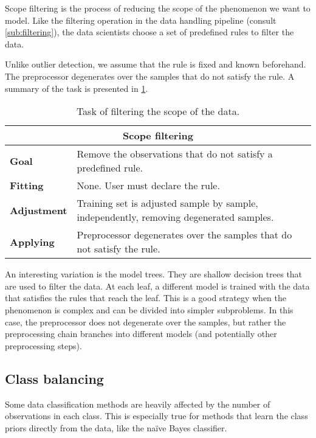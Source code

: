 Scope filtering is the process of reducing the scope of the phenomenon we want to model.
Like the filtering operation in the data handling pipeline (consult \cref{sub:filtering}),
the data scientists choose a set of predefined rules to filter the data.

Unlike outlier detection, we assume that the rule is fixed and known beforehand.  The
preprocessor degenerates over the samples that do not satisfy the rule.  A summary of the
task is presented in \cref{tab:scope-filtering}.

\begin{table}\caption{Task of filtering the scope of the data.}
  \centering
  \begin{tabular}{lp{6cm}}
    \toprule
    \multicolumn{2}{c}{\textbf{Scope filtering}} \\
    \midrule
    \textbf{Goal} &
      Remove the observations that do not satisfy a predefined rule. \\
    \textbf{Fitting} &
      None. User must declare the rule. \\
    \textbf{Adjustment} &
      Training set is adjusted sample by sample, independently, removing degenerated
      samples. \\
    \textbf{Applying} &
      Preprocessor degenerates over the samples that do not satisfy the rule. \\
    \bottomrule
  \end{tabular}
  \label{tab:scope-filtering}
\end{table}

An interesting variation is the model trees.  They are shallow
decision trees that are used to filter the data.  At each leaf, a different model is
trained with the data that satisfies the rules that reach the leaf.  This is a good
strategy when the phenomenon is complex and can be divided into simpler subproblems.
In this case, the preprocessor does not degenerate over the samples, but rather the
preprocessing chain branches into different models (and potentially other preprocessing
steps).

\subsection{Class balancing}

Some data classification methods are heavily affected by the number of observations in each
class.  This is especially true for methods that learn the class priors directly from the
data, like the naïve Bayes classifier.

